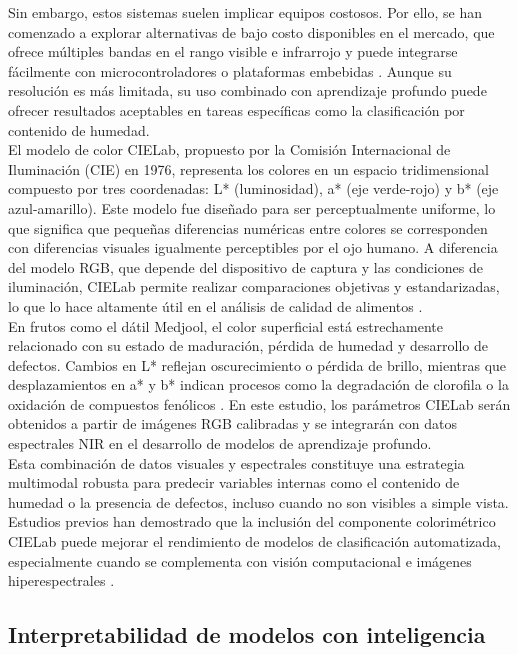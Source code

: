 Sin embargo, estos sistemas suelen implicar equipos costosos. Por ello, se han comenzado a explorar alternativas de bajo costo disponibles en el mercado, que ofrece múltiples bandas en el rango visible e infrarrojo y puede integrarse fácilmente con microcontroladores o plataformas embebidas \parencite{passos_deep_2023}. Aunque su resolución es más limitada, su uso combinado con aprendizaje profundo puede ofrecer resultados aceptables en tareas específicas como la clasificación por contenido de humedad.\\

El modelo de color CIELab, propuesto por la Comisión Internacional de Iluminación (CIE) en 1976, representa los colores en un espacio tridimensional compuesto por tres coordenadas: L* (luminosidad), a* (eje verde-rojo) y b* (eje azul-amarillo). Este modelo fue diseñado para ser perceptualmente uniforme, lo que significa que pequeñas diferencias numéricas entre colores se corresponden con diferencias visuales igualmente perceptibles por el ojo humano. A diferencia del modelo RGB, que depende del dispositivo de captura y las condiciones de iluminación, CIELab permite realizar comparaciones objetivas y estandarizadas, lo que lo hace altamente útil en el análisis de calidad de alimentos \parencite{cen_theory_2007}.\\

En frutos como el dátil Medjool, el color superficial está estrechamente relacionado con su estado de maduración, pérdida de humedad y desarrollo de defectos. Cambios en L* reflejan oscurecimiento o pérdida de brillo, mientras que desplazamientos en a* y b* indican procesos como la degradación de clorofila o la oxidación de compuestos fenólicos \parencite{knott_facilitated_2023}. En este estudio, los parámetros CIELab serán obtenidos a partir de imágenes RGB calibradas y se integrarán con datos espectrales NIR en el desarrollo de modelos de aprendizaje profundo.\\

Esta combinación de datos visuales y espectrales constituye una estrategia multimodal robusta para predecir variables internas como el contenido de humedad o la presencia de defectos, incluso cuando no son visibles a simple vista. Estudios previos han demostrado que la inclusión del componente colorimétrico CIELab puede mejorar el rendimiento de modelos de clasificación automatizada, especialmente cuando se complementa con visión computacional e imágenes hiperespectrales \parencite{habib_external_2022}.

\subsection{Interpretabilidad de modelos con inteligencia}


